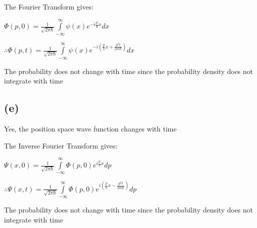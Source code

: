 \documentclass[12pt]{article}
\begin{document}
\begin{spacing}{2.0}
The Fourier Transform gives:

$\Phi(p,0) = \frac{1}{\sqrt{2\pi \hbar}} \int\limits_{-\infty}^{\infty} \psi(x) e^{-i\frac{p}{\hbar}x} dx$

$\therefore \Phi(p,t) = \frac{1}{\sqrt{2\pi \hbar}} \int\limits_{-\infty}^{\infty} \psi(x) e^{-i(\frac{p}{\hbar}x+ \frac{p^2t}{2m\hbar})} dx$


The probability does not change with time since the probability density does not integrate with time %

\subsection*{(e)}
Yes, the position space wave function changes with time

The Inverse Fourier Transform gives:

$\Psi(x,0) = \frac{1}{\sqrt{2\pi \hbar}} \int\limits_{-\infty}^{\infty} \Phi(p,0) e^{i\frac{p}{\hbar}x} dp$

$\therefore \Psi(x,t) = \frac{1}{\sqrt{2\pi \hbar}} \int\limits_{-\infty}^{\infty} \Phi(p,0) e^{i(\frac{p}{\hbar}x- \frac{p^2t}{2m\hbar})} dp$

The probability does not change with time since the probability density does not integrate with time %
\end{spacing}
\end{document}
